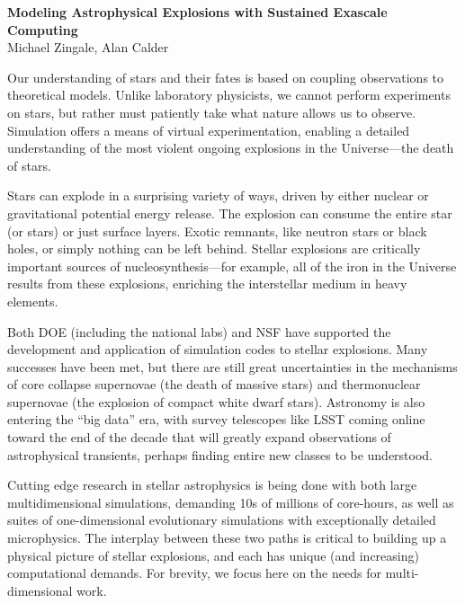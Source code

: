\documentclass[11pt,twocolumn]{article}
\begin{document}
\begin{center}
{\sffamily \bfseries Modeling Astrophysical Explosions with Sustained Exascale Computing} \\
Michael Zingale\footnotemark[1], Alan Calder\footnotemark[1]
\end{center}
%

Our understanding of stars and their fates is based on coupling
observations to theoretical models.  Unlike laboratory physicists, we
cannot perform experiments on stars, but rather must
patiently take what nature allows us to observe.  Simulation offers a means
of virtual experimentation, enabling a detailed understanding of the
most violent ongoing explosions in the Universe---the death of stars.

Stars can explode in a surprising variety of ways, driven by either
nuclear or gravitational potential energy release.  The
explosion can consume the entire star (or stars) or just
surface layers.  Exotic remnants, like neutron stars or black holes, or
simply nothing can be left behind.  Stellar explosions are critically
important sources of nucleosynthesis---for example, all of the iron in
the Universe results from these explosions, enriching the interstellar
medium in heavy elements. 

Both DOE (including the national labs) and
NSF have supported the development and application of simulation codes
to stellar explosions.  Many successes have been met, but there are
still great uncertainties in the mechanisms of core collapse
supernovae (the death of massive stars) and thermonuclear supernovae
(the explosion of compact white dwarf stars).  Astronomy is also
entering the ``big data'' era, with survey telescopes like LSST coming
online toward the end of the decade that will greatly expand
observations of astrophysical transients, perhaps finding entire new
classes to be understood.

Cutting edge research in stellar astrophysics is being done with both
large multidimensional simulations, demanding 10s of millions of
core-hours, as well as suites of one-dimensional evolutionary
simulations with exceptionally detailed microphysics.  The interplay
between these two paths is critical to building up a physical picture
of stellar explosions, and each has unique (and increasing)
computational demands.  For brevity, we focus here on the needs for
multi-dimensional work.
\end{document}
